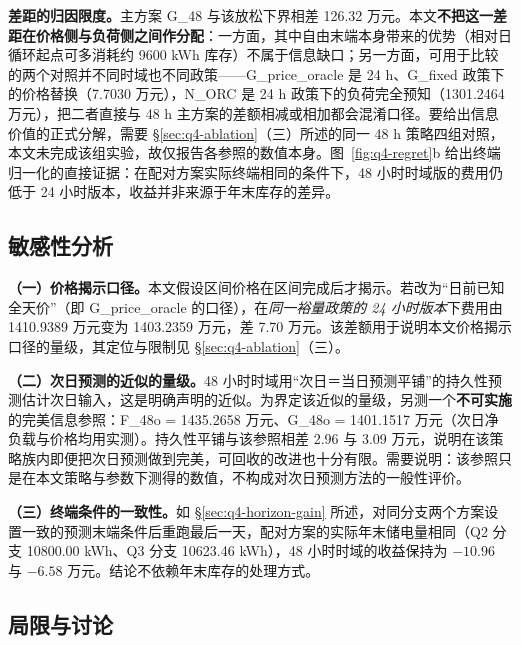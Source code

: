 \textbf{差距的归因限度。}主方案 G\_48 与该放松下界相差 126.32 万元。本文\textbf{不把这一差距在价格侧与负荷侧之间作分配}：一方面，其中自由末端本身带来的优势（相对日循环起点可多消耗约 9600 kWh 库存）不属于信息缺口；另一方面，可用于比较的两个对照并不同时域也不同政策——G\_price\_oracle 是 24 h、G\_fixed 政策下的价格替换（7.7030 万元），N\_ORC 是 24 h 政策下的负荷完全预知（1301.2464 万元），把二者直接与 48 h 主方案的差额相减或相加都会混淆口径。要给出信息价值的正式分解，需要 \S\ref{sec:q4-ablation}（三）所述的同一 48 h 策略四组对照，本文未完成该组实验，故仅报告各参照的数值本身。图~\ref{fig:q4-regret}b 给出终端归一化的直接证据：在配对方案实际终端相同的条件下，48 小时时域版的费用仍低于 24 小时版本，收益并非来源于年末库存的差异。

\subsection{敏感性分析}
\label{sec:q4-sens}

\textbf{（一）价格揭示口径。}本文假设区间价格在区间完成后才揭示。若改为``日前已知全天价''（即 G\_price\_oracle 的口径），在\emph{同一裕量政策的 24 小时版本}下费用由 1410.9389 万元变为 1403.2359 万元，差 7.70 万元。该差额用于说明本文价格揭示口径的量级，其定位与限制见 \S\ref{sec:q4-ablation}（三）。

\textbf{（二）次日预测的近似的量级。}48 小时时域用``次日＝当日预测平铺''的持久性预测估计次日输入，这是明确声明的近似。为界定该近似的量级，另测一个\textbf{不可实施}的完美信息参照：F\_48o = 1435.2658 万元、G\_48o = 1401.1517 万元（次日净负载与价格均用实测）。持久性平铺与该参照相差 2.96 与 3.09 万元，说明在该策略族内即便把次日预测做到完美，可回收的改进也十分有限。需要说明：该参照只是在本文策略与参数下测得的数值，不构成对次日预测方法的一般性评价。

\textbf{（三）终端条件的一致性。}如 \S\ref{sec:q4-horizon-gain} 所述，对同分支两个方案设置一致的预测末端条件后重跑最后一天，配对方案的实际年末储电量相同（Q2 分支 10800.00 kWh、Q3 分支 10623.46 kWh），48 小时时域的收益保持为 $-10.96$ 与 $-6.58$ 万元。结论不依赖年末库存的处理方式。

\subsection{局限与讨论}
\label{sec:q4-limit}

